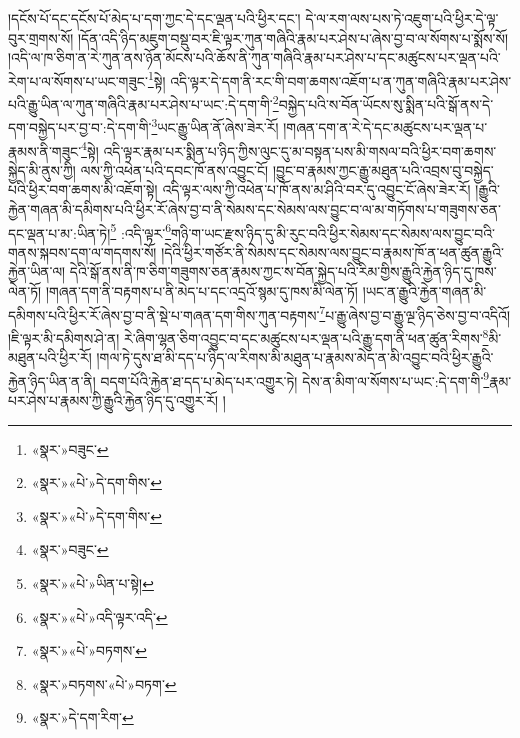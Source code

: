 །དངོས་པོ་དང་དངོས་པོ་མེད་པ་དག་ཀྱང་དེ་དང་ལྡན་པའི་ཕྱིར་དང་། དེ་ལ་རག་ལས་པས་ཏེ་འཇུག་པའི་ཕྱིར་དེ་ལྟ་བུར་གྲགས་སོ། །དོན་འདི་ཉིད་མཇུག་བསྡུ་བར་ཇི་ལྟར་ཀུན་གཞིའི་རྣམ་པར་ཤེས་པ་ཞེས་བྱ་བ་ལ་སོགས་པ་སྨོས་སོ། །འདི་ལ་ཁ་ཅིག་ན་རེ་ཀུན་ནས་ཉོན་མོངས་པའི་ཆོས་ནི་ཀུན་གཞིའི་རྣམ་པར་ཤེས་པ་དང་མཚུངས་པར་ལྡན་པའི་རེག་པ་ལ་སོགས་པ་ཡང་གཟུང་\footnote{«སྣར་»བཟུང་}སྟེ། འདི་ལྟར་དེ་དག་ནི་རང་གི་བག་ཆགས་འཇོག་པ་ན་ཀུན་གཞིའི་རྣམ་པར་ཤེས་པའི་རྒྱུ་ཡིན་ལ་ཀུན་གཞིའི་རྣམ་པར་ཤེས་པ་ཡང་:དེ་དག་གི་\footnote{«སྣར་»«པེ་»དེ་དག་གིས་}བསྐྱེད་པའི་ས་བོན་ཡོངས་སུ་སྨིན་པའི་སྒོ་ནས་དེ་དག་བསྐྱེད་པར་བྱ་བ་:དེ་དག་གི་\footnote{«སྣར་»«པེ་»དེ་དག་གིས་}ཡང་རྒྱུ་ཡིན་ནོ་ཞེས་ཟེར་རོ། །གཞན་དག་ན་རེ་དེ་དང་མཚུངས་པར་ལྡན་པ་རྣམས་ནི་གཟུང་\footnote{«སྣར་»བཟུང་}སྟེ། འདི་ལྟར་རྣམ་པར་སྨིན་པ་ཉིད་ཀྱིས་ལུང་དུ་མ་བསྟན་པས་མི་གསལ་བའི་ཕྱིར་བག་ཆགས་སྐྱེད་མི་ནུས་ཀྱི། ལས་ཀྱི་འཕེན་པའི་དབང་ཁོ་ནས་འབྱུང་ངོ། །བྱུང་བ་རྣམས་ཀྱང་རྒྱུ་མཐུན་པའི་འབྲས་བུ་བསྐྱེད་པའི་ཕྱིར་བག་ཆགས་མི་འཇོག་སྟེ། འདི་ལྟར་ལས་ཀྱི་འཕེན་པ་ཁོ་ནས་མ་ཤིའི་བར་དུ་འབྱུང་ངོ་ཞེས་ཟེར་རོ། །རྒྱུའི་རྐྱེན་གཞན་མི་དམིགས་པའི་ཕྱིར་རོ་ཞེས་བྱ་བ་ནི་སེམས་དང་སེམས་ལས་བྱུང་བ་ལ་མ་གཏོགས་པ་གཟུགས་ཅན་དང་ལྡན་པ་མ་:ཡིན་ཏེ།\footnote{«སྣར་»«པེ་»ཡིན་པ་སྟེ།} :འདི་ལྟར་\footnote{«སྣར་»«པེ་»འདི་ལྟར་འདི་}གཉི་ག་ཡང་རྫས་ཉིད་དུ་མི་རུང་བའི་ཕྱིར་སེམས་དང་སེམས་ལས་བྱུང་བའི་གནས་སྐབས་དག་ལ་གདགས་སོ། །དེའི་ཕྱིར་གཙོར་ནི་སེམས་དང་སེམས་ལས་བྱུང་བ་རྣམས་ཁོ་ན་ཕན་ཚུན་རྒྱུའི་རྐྱེན་ཡིན་ལ། དེའི་སྒོ་ནས་ནི་ཁ་ཅིག་གཟུགས་ཅན་རྣམས་ཀྱང་ས་བོན་སྐྱེད་པའི་རིམ་གྱིས་རྒྱུའི་རྐྱེན་ཉིད་དུ་ཁས་ལེན་ཏོ། །གཞན་དག་ནི་བརྟགས་པ་ནི་མེད་པ་དང་འདྲའོ་སྙམ་དུ་ཁས་མི་ལེན་ཏོ། །ཡང་ན་རྒྱུའི་རྐྱེན་གཞན་མི་དམིགས་པའི་ཕྱིར་རོ་ཞེས་བྱ་བ་ནི་སྡེ་པ་གཞན་དག་གིས་ཀུན་བརྟགས་\footnote{«སྣར་»«པེ་»བཏགས་}པ་རྒྱུ་ཞེས་བྱ་བ་རྒྱུ་ལྔ་ཉིད་ཅེས་བྱ་བ་འདིའོ། །ཇི་ལྟར་མི་དམིགས་ཤེ་ན། རེ་ཞིག་ལྷན་ཅིག་འབྱུང་བ་དང་མཚུངས་པར་ལྡན་པའི་རྒྱུ་དག་ནི་ཕན་ཚུན་རིགས་\footnote{«སྣར་»བཏགས་«པེ་»བཏག་}མི་མཐུན་པའི་ཕྱིར་རོ། །གལ་ཏེ་དུས་ཐ་མི་དད་པ་ཉིད་ལ་རིགས་མི་མཐུན་པ་རྣམས་མེད་ན་མི་འབྱུང་བའི་ཕྱིར་རྒྱུའི་རྐྱེན་ཉིད་ཡིན་ན་ནི། བདག་པོའི་རྐྱེན་ཐ་དད་པ་མེད་པར་འགྱུར་ཏེ། དེས་ན་མིག་ལ་སོགས་པ་ཡང་:དེ་དག་གི་\footnote{«སྣར་»དེ་དག་རིག་}རྣམ་པར་ཤེས་པ་རྣམས་ཀྱི་རྒྱུའི་རྐྱེན་ཉིད་དུ་འགྱུར་རོ། །
